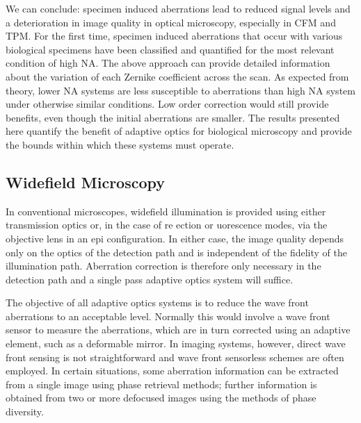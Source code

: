We can conclude: specimen induced aberrations lead to reduced signal levels 
and a deterioration in image quality in optical microscopy, especially in CFM 
and TPM. For the first time, specimen induced aberrations that occur with 
various biological specimens have been classified and quantified for the most 
relevant condition of high NA. The above approach can provide detailed 
information about the variation of each Zernike coefficient across the scan.
As expected from theory, lower NA systems are less susceptible to aberrations 
than high NA system under otherwise similar conditions. Low order correction 
would still provide benefits, even though the initial aberrations are 
smaller. The results presented here quantify the benefit of adaptive optics 
for biological microscopy and provide the bounds within which these systems 
must operate.
\cite{characterizing_abberations}

\subsection{Widefield Microscopy}
\label{sec:WidefieldMicroscopy}

In conventional microscopes, widefield illumination is provided using either 
transmission optics or, in the case of re ection or uorescence modes, via the 
objective lens in an epi configuration. In either case, the image quality 
depends only on the optics of the detection path and is independent of the 
fidelity of the illumination path.
Aberration correction is therefore only necessary in the detection path and a 
single pass adaptive optics system will suffice.
\cite{Aberrations_book} 

The objective of all adaptive optics systems is to reduce the wave front 
aberrations to an acceptable level. Normally this would involve a wave front 
sensor to measure the aberrations, which are in turn corrected using an 
adaptive element, such as a deformable mirror. In imaging systems, however, 
direct wave front sensing is not straightforward and wave front sensorless 
schemes are often employed. In certain situations, some aberration 
information can be extracted from a single image using phase retrieval 
methods; further information is obtained from two or more defocused images 
using the methods of phase diversity.


